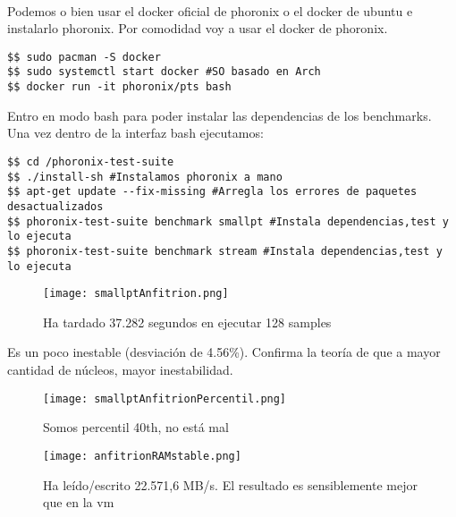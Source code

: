 \quad\\
Podemos o bien usar el docker oficial de phoronix o el docker de ubuntu e instalarlo phoronix. Por comodidad voy a usar el docker de phoronix.

\begin{verbatim}
$$ sudo pacman -S docker
$$ sudo systemctl start docker #SO basado en Arch
$$ docker run -it phoronix/pts bash
\end{verbatim}
Entro en modo bash para poder instalar las dependencias de los benchmarks. Una vez dentro de la interfaz bash ejecutamos:

\begin{verbatim}
$$ cd /phoronix-test-suite
$$ ./install-sh #Instalamos phoronix a mano
$$ apt-get update --fix-missing #Arregla los errores de paquetes desactualizados
$$ phoronix-test-suite benchmark smallpt #Instala dependencias,test y lo ejecuta
$$ phoronix-test-suite benchmark stream #Instala dependencias,test y lo ejecuta
\end{verbatim}

\begin{figure}[H]
	\centering
	\texttt{[image: smallptAnfitrion.png]}
	\caption{Ha tardado 37.282 segundos en ejecutar 128 samples}
\end{figure}
Es un poco inestable (desviación de 4.56\%). Confirma la teoría de que a mayor cantidad de núcleos, mayor inestabilidad.
\begin{figure}[H]
	\centering
	\texttt{[image: smallptAnfitrionPercentil.png]}
	\caption{Somos percentil 40th, no está mal}
\end{figure}

\begin{figure}[H]
	\centering
	\texttt{[image: anfitrionRAMstable.png]}
	\caption{Ha leído/escrito 22.571,6 MB/s. El resultado es sensiblemente mejor que en la vm \cite{anfitrionStream}}
\end{figure}

